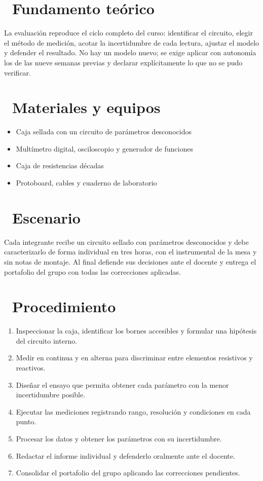 \documentclass[11pt,a4paper]{article}
\newcommand{\iconotexto}[2]{\textcolor{cyanNeon}{\faIcon{#1}}~#2}
\begin{document}
\section{\iconotexto{book-open}{Fundamento teórico}}

La evaluación reproduce el ciclo completo del curso: identificar el
circuito, elegir el método de medición, acotar la incertidumbre de cada
lectura, ajustar el modelo y defender el resultado. No hay un modelo nuevo;
se exige aplicar con autonomía los de las nueve semanas previas y declarar
explícitamente lo que no se pudo verificar.

\section{\iconotexto{box-open}{Materiales y equipos}}

\begin{itemize}[leftmargin=1.4em,itemsep=2pt,topsep=3pt]
  \item Caja sellada con un circuito de parámetros desconocidos
  \item Multímetro digital, osciloscopio y generador de funciones
  \item Caja de resistencias décadas
  \item Protoboard, cables y cuaderno de laboratorio
\end{itemize}

\section{\iconotexto{flask}{Escenario}}

Cada integrante recibe un circuito sellado con parámetros desconocidos y debe caracterizarlo de forma individual en tres horas, con el instrumental de la mesa y sin notas de montaje. Al final defiende sus decisiones ante el docente y entrega el portafolio del grupo con todas las correcciones aplicadas.

\section{\iconotexto{list-ol}{Procedimiento}}

\begin{enumerate}[leftmargin=1.4em,itemsep=2pt,topsep=3pt]
  \item Inspeccionar la caja, identificar los bornes accesibles y formular una hipótesis del circuito interno.
  \item Medir en continua y en alterna para discriminar entre elementos resistivos y reactivos.
  \item Diseñar el ensayo que permita obtener cada parámetro con la menor incertidumbre posible.
  \item Ejecutar las mediciones registrando rango, resolución y condiciones en cada punto.
  \item Procesar los datos y obtener los parámetros con su incertidumbre.
  \item Redactar el informe individual y defenderlo oralmente ante el docente.
  \item Consolidar el portafolio del grupo aplicando las correcciones pendientes.
\end{enumerate}
\end{document}
